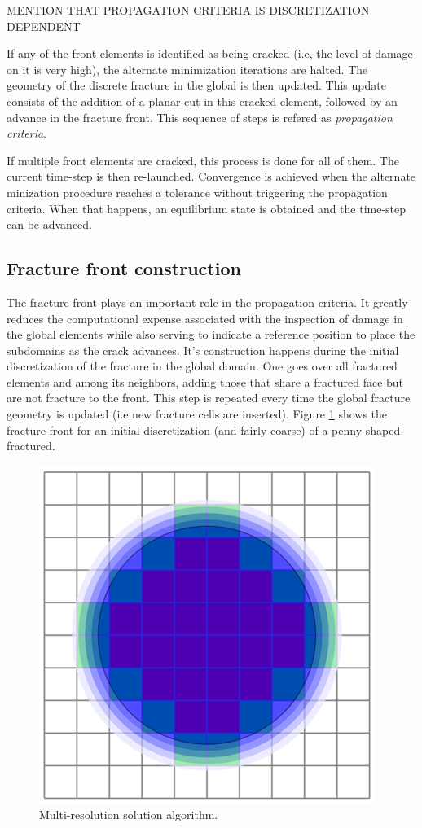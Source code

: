MENTION THAT PROPAGATION CRITERIA IS DISCRETIZATION DEPENDENT

If any of the front elements is identified as being cracked (i.e, the level of damage on it is very high), the alternate minimization iterations are halted. The geometry of the discrete fracture in the global is then updated. This update consists of the addition of a planar cut in this cracked element, followed by an advance in the fracture front. This sequence of steps is refered as \textit{propagation criteria}.

If multiple front elements are cracked, this process is done for all of them. The current time-step is then re-launched. Convergence is achieved when the alternate minization procedure reaches a tolerance without triggering the propagation criteria. When that happens, an equilibrium state is obtained and the time-step can be advanced.

\subsection{Fracture front construction}

The fracture front plays an important role in the propagation criteria. It greatly reduces the computational expense associated with the inspection of damage in the global elements while also serving to indicate a reference position to place the subdomains as the crack advances. It's construction happens during the initial discretization of the fracture in the global domain. One goes over all fractured elements and among its neighbors, adding those that share a fractured face but are not fracture to the front. This step is repeated every time the global fracture geometry is updated (i.e new fracture cells are inserted). Figure \ref{fig:lorem0} shows the fracture front for an initial discretization (and fairly coarse) of a penny shaped fractured.

\begin{figure}[h]
    \centering
    \includegraphics[width=0.5\linewidth]{Chapter4/figures/blue_circle.png}
    \caption{Multi-resolution solution algorithm.}
    \label{fig:lorem0}
\end{figure}


